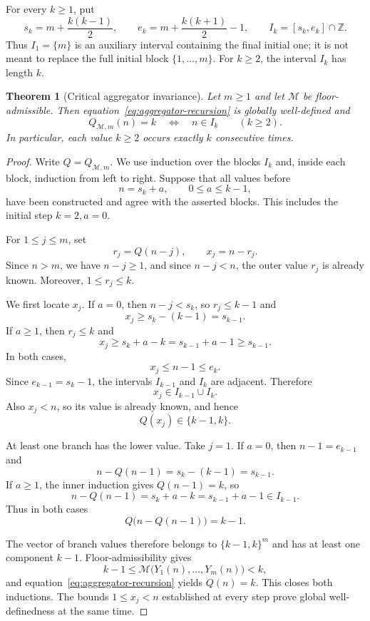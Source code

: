 \documentclass[11pt]{article}
\newtheorem{theorem}{Theorem}[section]
\theoremstyle{definition}
\theoremstyle{remark}
\begin{document}
For every $k\ge1$, put
\begin{equation}\label{eq:block-endpoints}
s_k=m+\frac{k(k-1)}2,
\qquad
e_k=m+\frac{k(k+1)}2-1,
\qquad
I_k=[s_k,e_k]\cap\mathbb{Z}.
\end{equation}
Thus $I_1=\{m\}$ is an auxiliary interval containing the final initial one;
it is not meant to replace the full initial block $\{1,\ldots,m\}$.
For $k\ge2$, the interval $I_k$ has length $k$.

\begin{theorem}[Critical aggregator invariance]\label{thm:aggregator}
Let $m\ge1$ and let $\mathcal{M}$ be floor-admissible.  Then
equation~\eqref{eq:aggregator-recursion} is globally well-defined and
\begin{equation}\label{eq:exact-blocks}
Q_{\mathcal{M},m}(n)=k
\quad\Longleftrightarrow\quad
n\in I_k
\qquad (k\ge2).
\end{equation}
In particular, each value $k\ge2$ occurs exactly $k$ consecutive times.
\end{theorem}

\begin{proof}
Write $Q=Q_{\mathcal{M},m}$.  We use induction over the blocks $I_k$ and,
inside each block, induction from left to right.  Suppose that all values
before
\[
n=s_k+a,
\qquad 0\le a\le k-1,
\]
have been constructed and agree with the asserted blocks.  This includes
the initial step $k=2,a=0$.

For $1\le j\le m$, set
\[
r_j=Q(n-j),
\qquad
x_j=n-r_j.
\]
Since $n>m$, we have $n-j\ge1$, and since $n-j<n$, the outer value $r_j$
is already known.  Moreover, $1\le r_j\le k$.

We first locate $x_j$.  If $a=0$, then $n-j<s_k$, so $r_j\le k-1$ and
\[
x_j\ge s_k-(k-1)=s_{k-1}.
\]
If $a\ge1$, then $r_j\le k$ and
\[
x_j\ge s_k+a-k=s_{k-1}+a-1\ge s_{k-1}.
\]
In both cases,
\[
x_j\le n-1\le e_k.
\]
Since $e_{k-1}=s_k-1$, the intervals $I_{k-1}$ and $I_k$ are adjacent.
Therefore
\[
x_j\in I_{k-1}\cup I_k.
\]
Also $x_j<n$, so its value is already known, and hence
\begin{equation}\label{eq:two-level-branches}
Q(x_j)\in\{k-1,k\}.
\end{equation}

At least one branch has the lower value.  Take $j=1$.  If $a=0$, then
$n-1=e_{k-1}$ and
\[
n-Q(n-1)=s_k-(k-1)=s_{k-1}.
\]
If $a\ge1$, the inner induction gives $Q(n-1)=k$, so
\[
n-Q(n-1)=s_k+a-k=s_{k-1}+a-1\in I_{k-1}.
\]
Thus in both cases
\begin{equation}\label{eq:lower-branch}
Q\bigl(n-Q(n-1)\bigr)=k-1.
\end{equation}

The vector of branch values therefore belongs to $\{k-1,k\}^m$ and has at
least one component $k-1$.  Floor-admissibility gives
\[
k-1
\le
\mathcal{M}\bigl(Y_1(n),\ldots,Y_m(n)\bigr)
<k,
\]
and equation~\eqref{eq:aggregator-recursion} yields $Q(n)=k$.  This closes
both inductions.  The bounds $1\le x_j<n$ established at every step prove
global well-definedness at the same time.
\end{proof}
\end{document}
